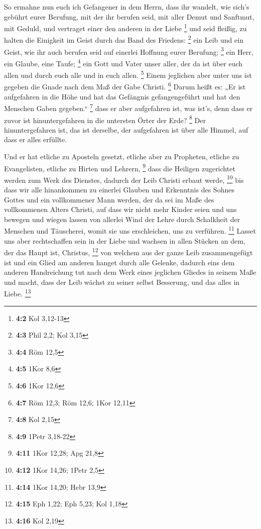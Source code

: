  So ermahne nun euch ich Gefangener in dem Herrn, dass ihr
wandelt, wie sich's gebührt eurer Berufung, mit der ihr berufen seid,
 mit aller Demut und Sanftmut, mit Geduld, und vertraget
einer den anderen in der Liebe \footnote{\textbf{4:2} Kol 3,12-13}
 und seid fleißig, zu halten die Einigkeit im Geist durch
das Band des Friedens: \footnote{\textbf{4:3} Phil 2,2; Kol 3,15}
 ein Leib und ein Geist, wie ihr auch berufen seid auf
einerlei Hoffnung eurer Berufung; \footnote{\textbf{4:4} Röm 12,5}
 ein Herr, ein Glaube, eine Taufe; \footnote{\textbf{4:5}
  1Kor 8,6}  ein Gott und Vater unser aller, der da ist
über euch allen und durch euch alle und in euch allen. \footnote{\textbf{4:6}
  1Kor 12,6}  Einem jeglichen aber unter uns ist gegeben
die Gnade nach dem Maß der Gabe Christi. \footnote{\textbf{4:7} Röm
  12,3; Röm 12,6; 1Kor 12,11}  Darum heißt es: „Er ist
aufgefahren in die Höhe und hat das Gefängnis gefangengeführt und hat
den Menschen Gaben gegeben.`` \footnote{\textbf{4:8} Kol 2,15}
 dass er aber aufgefahren ist, was ist's, denn dass er
zuvor ist hinuntergefahren in die untersten Örter der Erde? \footnote{\textbf{4:9}
  1Petr 3,18-22}  Der hinuntergefahren ist, das ist
derselbe, der aufgefahren ist über alle Himmel, auf dass er alles
erfüllte.

 Und er hat etliche zu Aposteln gesetzt, etliche aber zu
Propheten, etliche zu Evangelisten, etliche zu Hirten und Lehrern,
\footnote{\textbf{4:11} 1Kor 12,28; Apg 21,8}  dass die
Heiligen zugerichtet werden zum Werk des Dienstes, dadurch der Leib
Christi erbaut werde, \footnote{\textbf{4:12} 1Kor 14,26; 1Petr 2,5}
 bis dass wir alle hinankommen zu einerlei Glauben und
Erkenntnis des Sohnes Gottes und ein vollkommener Mann werden, der da
sei im Maße des vollkommenen Alters Christi,  auf dass
wir nicht mehr Kinder seien und uns bewegen und wiegen lassen von
allerlei Wind der Lehre durch Schalkheit der Menschen und Täuscherei,
womit sie uns erschleichen, uns zu verführen. \footnote{\textbf{4:14}
  1Kor 14,20; Hebr 13,9}  Lasset uns aber rechtschaffen
sein in der Liebe und wachsen in allen Stücken an dem, der das Haupt
ist, Christus, \footnote{\textbf{4:15} Eph 1,22; Eph 5,23; Kol 1,18}
 von welchem aus der ganze Leib zusammengefügt ist und
ein Glied am anderen hanget durch alle Gelenke, dadurch eins dem anderen
Handreichung tut nach dem Werk eines jeglichen Gliedes in seinem Maße
und macht, dass der Leib wächst zu seiner selbst Besserung, und das
alles in Liebe. \footnote{\textbf{4:16} Kol 2,19}

